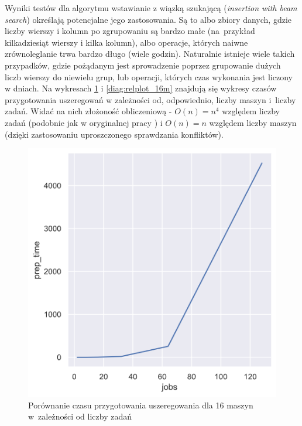 \documentclass[brudnopis]{xmgr}
\begin{document}
Wyniki testów dla algorytmu wstawianie z wiązką szukającą (\emph{insertion with beam search}) określają potencjalne jego zastosowania. Są to albo zbiory danych, gdzie liczby wierszy i kolumn po zgrupowaniu są bardzo małe (na~przykład kilkadziesiąt wierszy i kilka kolumn), albo operacje, których naiwne zrównoleglanie trwa bardzo długo (wiele godzin). Naturalnie istnieje wiele takich przypadków, gdzie pożądanym jest sprowadzenie poprzez grupowanie dużych liczb wierszy do niewielu grup, lub operacji, których czas wykonania jest liczony w dniach. Na wykresach \ref{diag:relplot_128j} i \ref{diag:relplot_16m} znajdują się wykresy czasów przygotowania uszeregowań w zależności od, odpowiednio, liczby maszyn i~liczby zadań. Widać na nich złożoność obliczeniową - $O(n)=n^4$ względem liczby zadań (podobnie jak w oryginalnej pracy \cite{brasel1993constructive}) i $O(n)=n$ względem liczby maszyn (dzięki zastosowaniu uproszczonego sprawdzania konfliktów).

\begin{figure}[!tbh]
\centering
\includegraphics[width=.8\hsize]{fig/relplot_128j.png}
\caption{Porównanie czasu przygotowania uszeregowania dla 16 maszyn w~zależności od liczby zadań\label{diag:relplot_128j}}
\end{figure}\medskip
\end{document}
